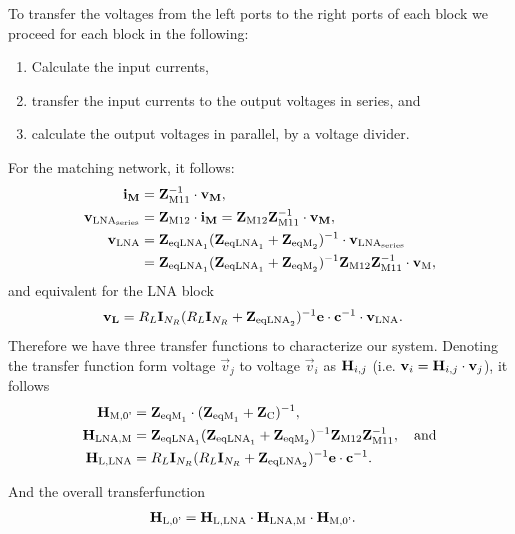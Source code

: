 To transfer the voltages from the left ports to the right ports of each block we proceed for each block in the following: 
\begin{enumerate}
\item{Calculate the input currents,}
\item{transfer the input currents to the output voltages in series, and}
\item{calculate the output voltages in parallel, by a voltage divider.}
\end{enumerate}
For the matching network, it follows:
\begin{align}
\mathbf{i_M} &= \mathbf{Z}_\text{M11}^{-1}\cdot\mathbf{v_M},\\
\mathbf{v}_{\text{LNA}_\text{series}} &= \mathbf{Z}_\text{M12}\cdot\mathbf{i_M} = \mathbf{Z}_\text{M12} \mathbf{Z}_\text{M11}^{-1}\cdot\mathbf{v_M},\\
\mathbf{v}_\text{LNA} &= \mathbf{Z}_{\text{eqLNA}_1}(\mathbf{Z}_{\text{eqLNA}_1}+\mathbf{Z}_{\text{eqM}_2})^{-1}\cdot\mathbf{v}_{\text{LNA}_\text{series}}\\\nonumber
&=\mathbf{Z}_{\text{eqLNA}_1}(\mathbf{Z}_{\text{eqLNA}_1}+\mathbf{Z}_{\text{eqM}_2})^{-1}\mathbf{Z}_\text{M12} \mathbf{Z}_\text{M11}^{-1}\cdot\mathbf{v}_\text{M},
\end{align}
and equivalent for the LNA block
\begin{align}
\mathbf{v_{L}}&=R_L\mathbf{I}_{N_R}(R_L\mathbf{I}_{N_R}+\mathbf{Z}_{\text{eqLNA}_2})^{-1}\mathbf{e}\cdot\mathbf{c}^{-1}\cdot\mathbf{v}_\text{LNA}.
\end{align}
Therefore we have three transfer functions to characterize our system.
Denoting the transfer function form voltage $\vec{v}_j$ to voltage $\vec{v}_i$ as $\mathbf{H}_{i,j}$ (i.e. $\mathbf{v}_i = \mathbf{H}_{i,j} \cdot\mathbf{v}_j$), it follows
\begin{align}
\mathbf{H}_\text{M,0'} &= \mathbf{Z}_{\text{eqM}_1}\cdot(\mathbf{Z}_{\text{eqM}_1} + \mathbf{Z}_\text{C})^{-1}, \\
\mathbf{H}_\text{LNA,M} &= \mathbf{Z}_{\text{eqLNA}_1}(\mathbf{Z}_{\text{eqLNA}_1}+\mathbf{Z}_{\text{eqM}_2})^{-1}\mathbf{Z}_\text{M12} \mathbf{Z}_\text{M11}^{-1},\quad\text{and}\\
\mathbf{H}_\text{L,LNA} &= R_L\mathbf{I}_{N_R}(R_L\mathbf{I}_{N_R}+\mathbf{Z}_{\text{eqLNA}_2})^{-1}\mathbf{e}\cdot\mathbf{c}^{-1}.
\end{align}

And the overall transferfunction
\begin{align}
\label{eq:transf_func}
\mathbf{H}_\text{L,0'} &= \mathbf{H}_\text{L,LNA}\cdot\mathbf{H}_\text{LNA,M}\cdot\mathbf{H}_\text{M,0'}.
\end{align}



